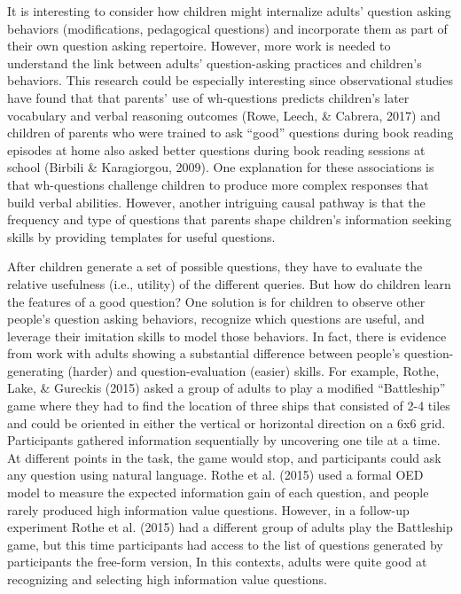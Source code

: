 \documentclass[oneside]{report}
\begin{document}
It is interesting to consider how children might internalize adults'
question asking behaviors (modifications, pedagogical questions) and
incorporate them as part of their own question asking repertoire.
However, more work is needed to understand the link between adults'
question-asking practices and children's behaviors. This research could
be especially interesting since observational studies have found that
that parents' use of wh-questions predicts children's later vocabulary
and verbal reasoning outcomes (Rowe, Leech, \& Cabrera, 2017) and
children of parents who were trained to ask ``good'' questions during
book reading episodes at home also asked better questions during book
reading sessions at school (Birbili \& Karagiorgou, 2009). One
explanation for these associations is that wh-questions challenge
children to produce more complex responses that build verbal abilities.
However, another intriguing causal pathway is that the frequency and
type of questions that parents shape children's information seeking
skills by providing templates for useful questions.

After children generate a set of possible questions, they have to
evaluate the relative usefulness (i.e., utility) of the different
queries. But how do children learn the features of a good question? One
solution is for children to observe other people's question asking
behaviors, recognize which questions are useful, and leverage their
imitation skills to model those behaviors. In fact, there is evidence
from work with adults showing a substantial difference between people's
question-generating (harder) and question-evaluation (easier) skills.
For example, Rothe, Lake, \& Gureckis (2015) asked a group of adults to
play a modified ``Battleship'' game where they had to find the location
of three ships that consisted of 2-4 tiles and could be oriented in
either the vertical or horizontal direction on a 6x6 grid. Participants
gathered information sequentially by uncovering one tile at a time. At
different points in the task, the game would stop, and participants
could ask any question using natural language. Rothe et al. (2015) used
a formal OED model to measure the expected information gain of each
question, and people rarely produced high information value questions.
However, in a follow-up experiment Rothe et al. (2015) had a different
group of adults play the Battleship game, but this time participants had
access to the list of questions generated by participants the free-form
version, In this contexts, adults were quite good at recognizing and
selecting high information value questions.
\end{document}
